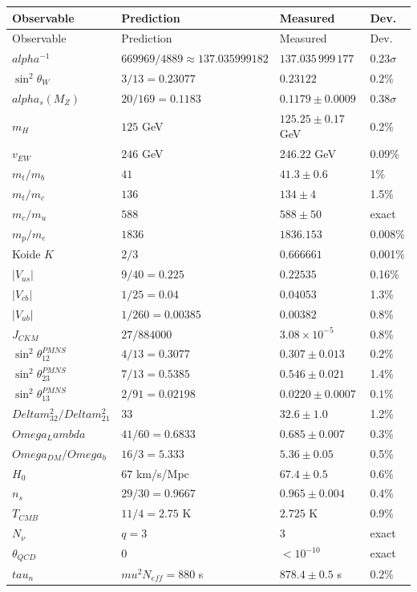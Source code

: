 \documentclass[12pt,a4paper]{article}
\def\mathrm#1{#1}%
\def\textbf#1{#1}%
\def\text#1{#1}%
\def\alpha{alpha}%
\def\Delta{Delta}%
\def\Lambda{Lambda}%
\def\mu{mu}%
\def\tau{tau}%
\def\Omega{Omega}%
\theoremstyle{definition}
\newcommand{\Neff}{N_{\mathrm{eff}}}
\begin{document}
\begin{center}
\small
\begin{longtable}{@{}llll@{}}
\toprule
\textbf{Observable} & \textbf{Prediction} & \textbf{Measured} & \textbf{Dev.} \\
\midrule
\endfirsthead
\toprule
\textbf{Observable} & \textbf{Prediction} & \textbf{Measured} & \textbf{Dev.} \\
\midrule
\endhead
\bottomrule
\endfoot
$\alpha^{-1}$ & $669969/4889 \approx 137.035999182$ & $137.035\,999\,177$ & 0.23$\sigma$ \\
$\sin^2\theta_W$ & $3/13 = 0.23077$ & $0.23122$ & $0.2\%$ \\
$\alpha_s(M_Z)$ & $20/169 = 0.1183$ & $0.1179\pm 0.0009$ & 0.38$\sigma$ \\
$m_H$ & $125$ GeV & $125.25\pm 0.17$ GeV & 0.2\% \\
$v_{\text{EW}}$ & $246$ GeV & $246.22$ GeV & 0.09\% \\
$m_t/m_b$ & $41$ & $41.3\pm 0.6$ & 1\% \\
$m_t/m_c$ & $136$ & $134\pm 4$ & 1.5\% \\
$m_c/m_u$ & $588$ & $588\pm 50$ & exact \\
$m_p/m_e$ & $1836$ & $1836.153$ & 0.008\% \\
Koide $K$ & $2/3$ & $0.666661$ & 0.001\% \\
$|V_{us}|$ & $9/40 = 0.225$ & $0.22535$ & 0.16\% \\
$|V_{cb}|$ & $1/25 = 0.04$ & $0.04053$ & 1.3\% \\
$|V_{ub}|$ & $1/260 = 0.00385$ & $0.00382$ & 0.8\% \\
$J_{\text{CKM}}$ & $27/884000$ & $3.08\times 10^{-5}$ & 0.8\% \\
$\sin^2\theta_{12}^{\text{PMNS}}$ & $4/13 = 0.3077$ & $0.307\pm 0.013$ & $0.2\%$ \\
$\sin^2\theta_{23}^{\text{PMNS}}$ & $7/13 = 0.5385$ & $0.546\pm 0.021$ & 1.4\% \\
$\sin^2\theta_{13}^{\text{PMNS}}$ & $2/91 = 0.02198$ & $0.0220\pm 0.0007$ & $0.1\%$ \\
$\Delta m^2_{32}/\Delta m^2_{21}$ & $33$ & $32.6\pm 1.0$ & 1.2\% \\
$\Omega_\Lambda$ & $41/60 = 0.6833$ & $0.685\pm 0.007$ & 0.3\% \\
$\Omega_{\text{DM}}/\Omega_b$ & $16/3 = 5.333$ & $5.36\pm 0.05$ & 0.5\% \\
$H_0$ & $67$ km/s/Mpc & $67.4\pm 0.5$ & 0.6\% \\
$n_s$ & $29/30 = 0.9667$ & $0.965\pm 0.004$ & 0.4\% \\
$T_{\text{CMB}}$ & $11/4 = 2.75$ K & $2.725$ K & 0.9\% \\
$N_\nu$ & $q=3$ & $3$ & exact \\
$\theta_{\text{QCD}}$ & $0$ & $<10^{-10}$ & exact \\
$\tau_n$ & $\mu^2\Neff = 880$ s & $878.4\pm 0.5$ s & $0.2\%$ \\
\end{longtable}
\end{center}
\end{document}
